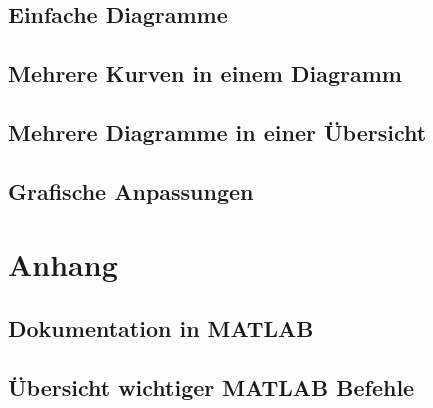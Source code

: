 \documentclass[12pt, a4paper, twoside]{article}
\begin{document}
        \subsection{Einfache Diagramme}
        \subsection{Mehrere Kurven in einem Diagramm}
        \subsection{Mehrere Diagramme in einer Übersicht}
        \subsection{Grafische Anpassungen}
    \section{Anhang}
        \subsection{Dokumentation in MATLAB}
        \subsection{Übersicht wichtiger MATLAB Befehle}
\end{document}
